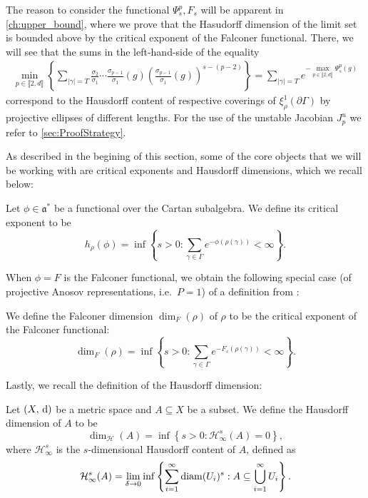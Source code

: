 \documentclass{report}
\begin{document}
\begin{remark}
    The reason to consider the functional $\Psi_s^p, F_s$ will be apparent in \cref{ch:upper_bound}, where we prove that the Hasudorff dimension of the limit set is bounded above by the critical exponent of the Falconer functional.
    There, we will see that the sums in the left-hand-side of the equality
\begin{align*}
    \min_{p \in \llbracket 2, d \rrbracket} 
    \left\{ 
        \sum_{|\gamma| = T} 
            \frac{\sigma_2}{\sigma_1}\cdots\frac{\sigma_{p-1}}{\sigma_1}(g) 
            \left( \frac{\sigma_{p-1}}{\sigma_1}(g) \right)^{s - (p-2)}
    \right\} = 
    \sum_{|\gamma| = T} e^{-\max\limits_{p \in \llbracket 2, d \rrbracket} \Psi_s^p(g)}
\end{align*}
correspond to the Hausdorff content of respective coverings of $\xi_\rho^1(\partial \Gamma)$ by projective ellipses of different lengths.
For the use of the unstable Jacobian $J_p^u$ we refer to \cref{sec:ProofStrategy}.
\end{remark}

As described in the begining of this section, some of the core objects that we will be working with are critical exponents and Hausdorff dimensions, which we recall below:
\begin{definition}
Let $\phi \in \mathfrak a^*$ be a functional over the Cartan subalgebra.
We define its critical exponent to be
\[
    h_\rho(\phi) = \inf
    \left\{
        s > 0: \sum_{\gamma \in \Gamma} e^{-\phi(\rho(\gamma))} < \infty
    \right\}.
\]    
\end{definition}

When $\phi = F$ is the Falconer functional, we obtain the following special case (of projective Anosov representations, i.e.\ $P = {1}$) of a definition from \cite{ledrappier_dimension_2023}:
\begin{definition}
    We define the Falconer dimension $\dim_F(\rho)$ of $\rho$ to be the critical exponent of the Falconer functional:
    \[
        \dim_F(\rho) = \inf
        \left\{
            s > 0: \sum_{\gamma \in \Gamma} e^{-F_s(\rho(\gamma))} < \infty
        \right\}.
    \]
\end{definition}

Lastly, we recall the definition of the Hausdorff dimension:
\begin{definition}
    Let $(X,\,\mathrm{d})$ be a metric space and $A \subseteq X$ be a subset.
    We define the Hausdorff dimension of $A$ to be
    \[
        \dim_{\mathcal H}(A) = \inf
        \left\{
            s > 0: \mathcal H^s_\infty(A) = 0
        \right\},
    \]
    where $\mathcal H^s_\infty$ is the $s$-dimensional Hausdorff content of $A$, defined as
    \[
        \mathcal H^s_\infty(A) = \lim_{\delta \to 0} \inf
        \left\{
            \sum_{i=1}^\infty \operatorname{diam}(U_i)^s: A \subseteq \bigcup_{i=1}^\infty U_i
        \right\}.
    \]
\end{definition}
\end{document}
